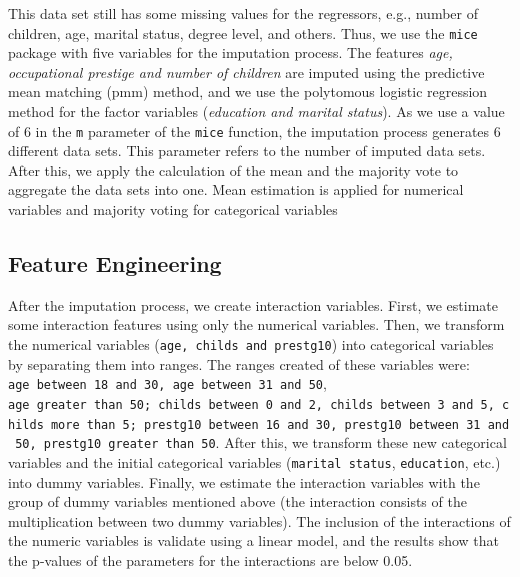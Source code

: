 \documentclass[11pt,a4paper]{article}
\begin{document}
This data set still has some missing values for the regressors, e.g.,
number of children, age, marital status, degree level, and others. Thus,
we use the \texttt{mice} package with five variables for the imputation
process. The features \emph{age, occupational prestige and number of
children} are imputed using the predictive mean matching (pmm) method,
and we use the polytomous logistic regression method for the factor
variables (\emph{education and marital status}). As we use a value of 6
in the \texttt{m} parameter of the \texttt{mice} function, the
imputation process generates 6 different data sets. This parameter
refers to the number of imputed data sets. After this, we apply the
calculation of the mean and the majority vote to aggregate the data sets
into one. Mean estimation is applied for numerical variables and
majority voting for categorical variables

\hypertarget{feature-engineering}{%
\subsection{Feature Engineering}\label{feature-engineering}}

After the imputation process, we create interaction variables. First, we
estimate some interaction features using only the numerical variables.
Then, we transform the numerical variables
(\texttt{age,\ childs\ and\ prestg10}) into categorical variables by
separating them into ranges. The ranges created of these variables were:
\texttt{age\ between\ 18\ and\ 30,\ age\ between\ 31\ and\ 50},
\texttt{age\ greater\ than\ 50;\ childs\ between\ 0\ and\ 2,\ childs\ between\ 3\ and\ 5,\ childs\ more\ than\ 5;\ prestg10\ between\ 16\ and\ 30,\ prestg10\ between\ 31\ and\ 50,\ prestg10\ greater\ than\ 50}.
After this, we transform these new categorical variables and the initial
categorical variables (\texttt{marital\ status}, \texttt{education},
etc.) into dummy variables. Finally, we estimate the interaction
variables with the group of dummy variables mentioned above (the
interaction consists of the multiplication between two dummy variables).
The inclusion of the interactions of the numeric variables is validate
using a linear model, and the results show that the p-values of the
parameters for the interactions are below 0.05.
\end{document}
